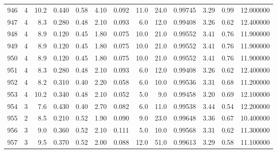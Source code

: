 \begin{tabular}{lrrrrrrrrrrrr}
946  &        4 &           10.2 &             0.440 &         0.58 &            4.10 &      0.092 &                 11.0 &                  24.0 &  0.99745 &  3.29 &       0.99 &  12.000000 \\
947  &        4 &            8.3 &             0.280 &         0.48 &            2.10 &      0.093 &                  6.0 &                  12.0 &  0.99408 &  3.26 &       0.62 &  12.400000 \\
948  &        4 &            8.9 &             0.120 &         0.45 &            1.80 &      0.075 &                 10.0 &                  21.0 &  0.99552 &  3.41 &       0.76 &  11.900000 \\
949  &        4 &            8.9 &             0.120 &         0.45 &            1.80 &      0.075 &                 10.0 &                  21.0 &  0.99552 &  3.41 &       0.76 &  11.900000 \\
950  &        4 &            8.9 &             0.120 &         0.45 &            1.80 &      0.075 &                 10.0 &                  21.0 &  0.99552 &  3.41 &       0.76 &  11.900000 \\
951  &        4 &            8.3 &             0.280 &         0.48 &            2.10 &      0.093 &                  6.0 &                  12.0 &  0.99408 &  3.26 &       0.62 &  12.400000 \\
952  &        4 &            8.2 &             0.310 &         0.40 &            2.20 &      0.058 &                  6.0 &                  10.0 &  0.99536 &  3.31 &       0.68 &  11.200000 \\
953  &        4 &           10.2 &             0.340 &         0.48 &            2.10 &      0.052 &                  5.0 &                   9.0 &  0.99458 &  3.20 &       0.69 &  12.100000 \\
954  &        3 &            7.6 &             0.430 &         0.40 &            2.70 &      0.082 &                  6.0 &                  11.0 &  0.99538 &  3.44 &       0.54 &  12.200000 \\
955  &        2 &            8.5 &             0.210 &         0.52 &            1.90 &      0.090 &                  9.0 &                  23.0 &  0.99648 &  3.36 &       0.67 &  10.400000 \\
956  &        3 &            9.0 &             0.360 &         0.52 &            2.10 &      0.111 &                  5.0 &                  10.0 &  0.99568 &  3.31 &       0.62 &  11.300000 \\
957  &        3 &            9.5 &             0.370 &         0.52 &            2.00 &      0.088 &                 12.0 &                  51.0 &  0.99613 &  3.29 &       0.58 &  11.100000 \\

\end{tabular}
